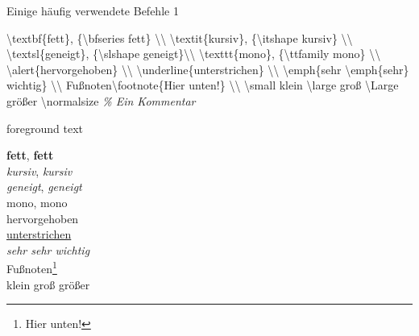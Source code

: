 \documentclass[aspectratio=169]{beamer}
\newenvironment{Shaded}{\begin{snugshade}}{\end{snugshade}}
\newcommand{\CommentTok}[1]{\textcolor[rgb]{0.57,0.57,0.57}{\textit{#1}}}
\newcommand{\FunctionTok}[1]{\textcolor[rgb]{0.34,0.51,0.35}{#1}}
\newcommand{\NormalTok}[1]{\textcolor[rgb]{0.19,0.19,0.19}{#1}}
\newenvironment{Shaded}{}{}
\begin{document}
    \begin{frame}[fragile]{Einige häufig verwendete Befehle 1}
    \protect\hypertarget{einige-huxe4ufig-verwendete-befehle-1}{}
    \begin{minipage}{0.66\textwidth}

\begin{Shaded}
\begin{Highlighting}[]
\FunctionTok{\textbackslash{}textbf}\NormalTok{\{fett\}, \{}\FunctionTok{\textbackslash{}bfseries}\NormalTok{ fett\} }\FunctionTok{\textbackslash{}\textbackslash{}}
\FunctionTok{\textbackslash{}textit}\NormalTok{\{kursiv\}, \{}\FunctionTok{\textbackslash{}itshape}\NormalTok{ kursiv\} }\FunctionTok{\textbackslash{}\textbackslash{}}
\FunctionTok{\textbackslash{}textsl}\NormalTok{\{geneigt\}, \{}\FunctionTok{\textbackslash{}slshape}\NormalTok{ geneigt\}}\FunctionTok{\textbackslash{}\textbackslash{}}
\FunctionTok{\textbackslash{}texttt}\NormalTok{\{mono\}, \{}\FunctionTok{\textbackslash{}ttfamily}\NormalTok{ mono\} }\FunctionTok{\textbackslash{}\textbackslash{}}
\FunctionTok{\textbackslash{}alert}\NormalTok{\{hervorgehoben\} }\FunctionTok{\textbackslash{}\textbackslash{}}
\FunctionTok{\textbackslash{}underline}\NormalTok{\{unterstrichen\} }\FunctionTok{\textbackslash{}\textbackslash{}}
\FunctionTok{\textbackslash{}emph}\NormalTok{\{sehr }\FunctionTok{\textbackslash{}emph}\NormalTok{\{sehr\} wichtig\} }\FunctionTok{\textbackslash{}\textbackslash{}}
\NormalTok{Fußnoten}\FunctionTok{\textbackslash{}footnote}\NormalTok{\{Hier unten!\} }\FunctionTok{\textbackslash{}\textbackslash{}}
\FunctionTok{\textbackslash{}small}\NormalTok{ klein }\FunctionTok{\textbackslash{}large}\NormalTok{ groß}
\FunctionTok{\textbackslash{}Large}\NormalTok{ größer }\FunctionTok{\textbackslash{}normalsize}
\CommentTok{\% Ein Kommentar}
\end{Highlighting}
\end{Shaded}

    \end{minipage}\begin{minipage}{0.33\textwidth}

    \bgroup 
        \begin{OutputBox}
        \begin{beamercolorbox}{foreground text}
            \selectfont%

    \textbf{fett}, {\bfseries fett} \\
    \textit{kursiv}, {\itshape kursiv} \\
    \textsl{geneigt}, {\slshape geneigt}\\
    {\selectfont mono}, {\selectfont mono} \\
    \alert{hervorgehoben} \\
    \underline{unterstrichen} \\
    \emph{sehr \emph{sehr} wichtig} \\
    Fußnoten\footnote{\selectfont Hier unten!} \\
    \small klein \large groß
    \Large größer \normalsize


\end{beamercolorbox}
\end{OutputBox}
\end{minipage}
\end{frame}
\end{document}
